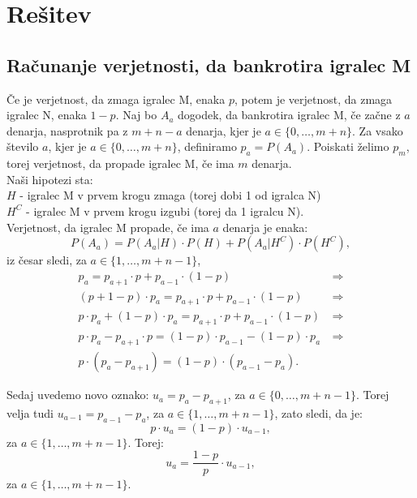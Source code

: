 \documentclass[12pt, a4paper]{article}
\begin{document}
\newpage

\section[Rešitev]{Rešitev}
\subsection{Računanje verjetnosti, da bankrotira igralec M}

Če je verjetnost, da zmaga igralec M, enaka $p$, potem je verjetnost, da zmaga igralec N, enaka $1-p$. Naj bo $A_a$ dogodek, da bankrotira igralec M, če začne z $a$ denarja, nasprotnik pa z $m + n - a$ denarja, kjer je $ a \in \{ 0, \dotso , m + n\}$. Za vsako število $a$, kjer je $ a \in \{ 0, \dotso , m + n\}$,  definiramo $p_a = P(A_a)$.
Poiskati želimo $p_m$, torej verjetnost, da propade igralec M, če ima $m$ denarja. 
\\

Naši hipotezi sta:
\\
$H$ - igralec M v prvem krogu zmaga (torej dobi 1 od igralca N)
\\
$H^C$ - igralec M v prvem krogu izgubi (torej da 1 igralcu N).
\\

Verjetnost, da igralec M propade, če ima $a$ denarja je enaka:
\\
$$P(A_a) = P(A_a \vert  H) \cdot P(H) + P(A_a \vert  H^C) \cdot P(H^C),$$
 iz česar sledi, za $ a \in \{1 , \dotso , m + n-1\}$,
\begin{equation*}
\begin{split}
p_a = p_{a+1} \cdot p + p_{a-1} \cdot (1 - p) &~ \Rightarrow \\
(p + 1 -p) \cdot p_a = p_{a+1} \cdot p + p_{a-1} \cdot (1 - p) &~ \Rightarrow \\
 p \cdot p_a + (1 - p) \cdot p_a = p_{a+1} \cdot p + p_{a-1} \cdot (1 - p) &~ \Rightarrow \\
p \cdot p_a - p_{a+1} \cdot p = (1 - p) \cdot  p_{a-1} - (1-p) \cdot p_a &~ \Rightarrow \\
p \cdot (p_a - p_{a+1}) = (1-p) \cdot (p_{a-1} - p_a). &~
\end{split}
\end{equation*}


Sedaj uvedemo novo oznako: $u_a = p_a - p_{a+1}$, za  $ a \in \{ 0, \dotso , m + n-1\}$. Torej velja tudi $u_{a-1} = p_{a-1} - p_a$, za $ a \in \{1 , \dotso , m + n-1\}$, zato sledi, da je:
$$p \cdot u_a = (1 - p) \cdot u_{a-1},$$  za $ a \in \{1 , \dotso , m + n-1\}.$
Torej: $$u_a = \frac{1-p}{p} \cdot u_{a-1},$$  za $ a \in \{1 , \dotso , m + n-1\}.$
\end{document}
